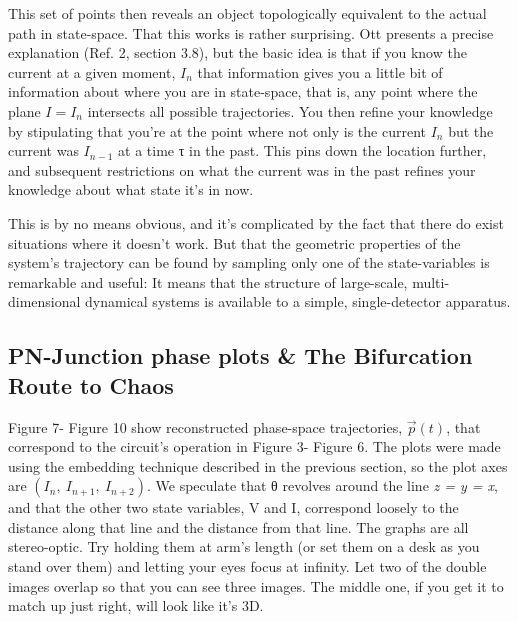 \documentclass{../lab}
\begin{document}
This set of points then reveals an object topologically equivalent to the actual path in state-space. That this works is rather surprising. Ott presents a precise explanation (Ref. 2, section 3.8), but the basic idea is that if you know the current at a given moment, $I_n$ that information gives you a little bit of information about where you are in state-space, that is, any point where the plane $I=I_n$ intersects all possible trajectories. You then refine your knowledge by stipulating that you're at the point where not only is the current  $I_n$ but the current was $I_{n-1}$ at a time τ in the past. This pins down the location further, and subsequent restrictions on what the current was in the past refines your knowledge about what state it's in now.

This is by no means obvious, and it's complicated by the fact that there do exist situations where it doesn't work. But that the geometric properties of the system's trajectory can be found by sampling only one of the state-variables is remarkable and useful: It means that the structure of large-scale, multi-dimensional dynamical systems is available to a simple, single-detector apparatus.

\subsection{PN-Junction phase plots \& The Bifurcation Route to Chaos}

Figure 7- Figure 10 show reconstructed phase-space trajectories, $ \vec p(t) $, that correspond to the circuit's operation in Figure 3- Figure 6. The plots were made using the embedding technique described in the previous section, so the plot axes are $ (I_n,~I_{n+1},~I_{n+2}) $. We speculate that θ revolves around the line \emph{z = y = x}, and that the other two state variables, V and I, correspond loosely to the distance along that line and the distance from that line. The graphs are all stereo-optic. Try holding them at arm's length (or set them on a desk as you stand over them) and letting your eyes focus at infinity. Let two of the double images overlap so that you can see three images. The middle one, if you get it to match up just right, will look like it's 3D.
\end{document}

